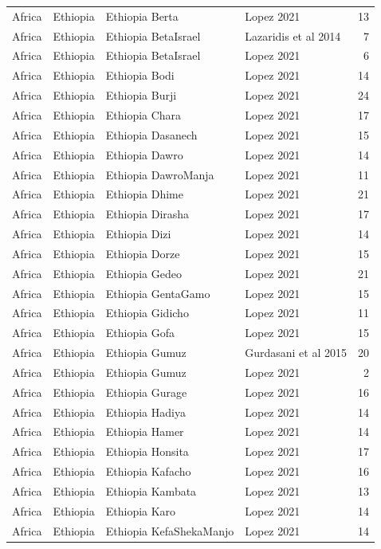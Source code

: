 \begin{longtable}[t]{lll>{\raggedright\arraybackslash}p{9em}r}
Africa & Ethiopia & Ethiopia Berta & Lopez 2021 & 13\\
Africa & Ethiopia & Ethiopia BetaIsrael & Lazaridis et al 2014 & 7\\
Africa & Ethiopia & Ethiopia BetaIsrael & Lopez 2021 & 6\\
Africa & Ethiopia & Ethiopia Bodi & Lopez 2021 & 14\\
Africa & Ethiopia & Ethiopia Burji & Lopez 2021 & 24\\
Africa & Ethiopia & Ethiopia Chara & Lopez 2021 & 17\\
Africa & Ethiopia & Ethiopia Dasanech & Lopez 2021 & 15\\
Africa & Ethiopia & Ethiopia Dawro & Lopez 2021 & 14\\
Africa & Ethiopia & Ethiopia DawroManja & Lopez 2021 & 11\\
Africa & Ethiopia & Ethiopia Dhime & Lopez 2021 & 21\\
Africa & Ethiopia & Ethiopia Dirasha & Lopez 2021 & 17\\
Africa & Ethiopia & Ethiopia Dizi & Lopez 2021 & 14\\
Africa & Ethiopia & Ethiopia Dorze & Lopez 2021 & 15\\
Africa & Ethiopia & Ethiopia Gedeo & Lopez 2021 & 21\\
Africa & Ethiopia & Ethiopia GentaGamo & Lopez 2021 & 15\\
Africa & Ethiopia & Ethiopia Gidicho & Lopez 2021 & 11\\
Africa & Ethiopia & Ethiopia Gofa & Lopez 2021 & 15\\
Africa & Ethiopia & Ethiopia Gumuz & Gurdasani et al 2015 & 20\\
Africa & Ethiopia & Ethiopia Gumuz & Lopez 2021 & 2\\
Africa & Ethiopia & Ethiopia Gurage & Lopez 2021 & 16\\
Africa & Ethiopia & Ethiopia Hadiya & Lopez 2021 & 14\\
Africa & Ethiopia & Ethiopia Hamer & Lopez 2021 & 14\\
Africa & Ethiopia & Ethiopia Honsita & Lopez 2021 & 17\\
Africa & Ethiopia & Ethiopia Kafacho & Lopez 2021 & 16\\
Africa & Ethiopia & Ethiopia Kambata & Lopez 2021 & 13\\
Africa & Ethiopia & Ethiopia Karo & Lopez 2021 & 14\\
Africa & Ethiopia & Ethiopia KefaShekaManjo & Lopez 2021 & 14\\

\end{longtable}
